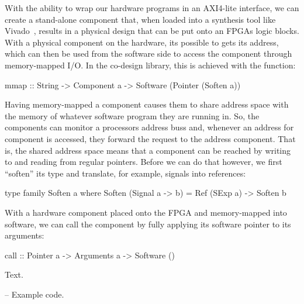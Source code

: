 \documentclass[../main.tex]{subfiles}
\begin{document}

With the ability to wrap our hardware programs in an AXI4-lite interface, we can create a stand-alone component that, when loaded into a synthesis tool like Vivado~\cite{feist2012}, results in a physical design that can be put onto an FPGAs logic blocks. With a physical component on the hardware, its possible to gets its address, which can then be used from the software side to access the component through memory-mapped I/O. In the co-design library, this is achieved with the  function:

\begin{code}
mmap :: String -> Component a -> Software (Pointer (Soften a))
\end{code}

Having memory-mapped a component causes them to share address space with the memory of whatever software program they are running in. So, the components can monitor a processors address buss and, whenever an address for component is accessed, they forward the request to the address component. That is, the shared address space means that a component can be reached by writing to and reading from regular pointers. Before we can do that however, we first ``soften'' its type and translate, for example, signals into references:


\begin{code}
type family Soften a where
  Soften (Signal a -> b) = Ref (SExp a) -> Soften b
\end{code}


With a hardware component placed onto the FPGA and memory-mapped into software, we can call the component by fully applying its software pointer to its arguments:

\begin{code}
call :: Pointer a -> Arguments a -> Software ()
\end{code}

Text.

\begin{code}
-- Example code.
\end{code}
\end{document}
